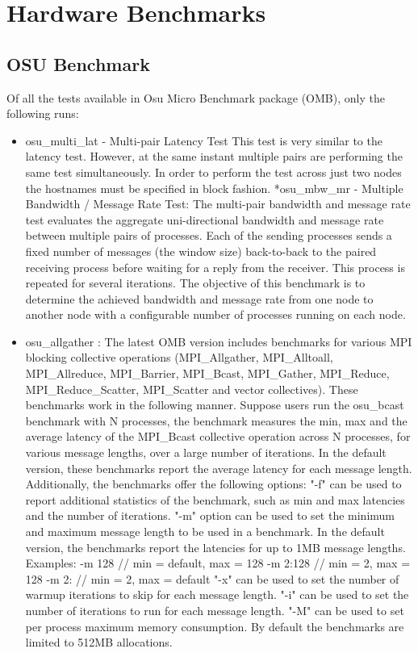 \documentclass[11pt,a4paper,oldfontcommands]{article}
\begin{document}
\clearpage
\section{Hardware Benchmarks}
\subsection{OSU Benchmark}
Of all the tests available in Osu Micro Benchmark package (OMB), only the following runs:
\begin{itemize}
\item osu\_multi\_lat - Multi-pair Latency Test
This test is very similar to the latency test. However, at the same instant multiple pairs are performing the same test simultaneously. In order to perform the test across just two nodes the hostnames must be specified in block fashion.
*osu\_mbw\_mr - Multiple Bandwidth / Message Rate Test: The multi-pair bandwidth and message rate test evaluates the aggregate uni-directional bandwidth and message rate between multiple pairs of processes. Each of the sending processes sends a fixed number of messages (the window size) back-to-back to the paired receiving process before waiting for a reply from the receiver. This process is repeated for several iterations. The objective of this benchmark is to determine the achieved bandwidth and message rate from one node to another node with a configurable number of processes running on each node.
\item osu\_allgather : The latest OMB version includes benchmarks for various MPI blocking collective operations (MPI\_Allgather, MPI\_Alltoall, MPI\_Allreduce, MPI\_Barrier, MPI\_Bcast, MPI\_Gather, MPI\_Reduce, MPI\_Reduce\_Scatter, MPI\_Scatter and vector collectives). These benchmarks work in the following manner. Suppose users run the osu\_bcast benchmark with N processes, the benchmark measures the min, max and the average latency of the MPI\_Bcast collective operation across N processes, for various message lengths, over a large number of iterations. In the default version, these benchmarks report the average latency for each message length. Additionally, the benchmarks offer the following options: "-f" can be used to report additional statistics of the benchmark, such as min and max latencies and the number of iterations. "-m" option can be used to set the minimum and maximum message length to be used in a benchmark. In the default version, the benchmarks report the latencies for up to 1MB message lengths. Examples: -m 128 // min = default, max = 128 -m 2:128 // min = 2, max = 128 -m 2: // min = 2, max = default "-x" can be used to set the number of warmup iterations to skip for each message length. "-i" can be used to set the number of iterations to run for each message length. "-M" can be used to set per process maximum memory consumption. By default the benchmarks are limited to 512MB allocations.

\end{itemize}
\end{document}
